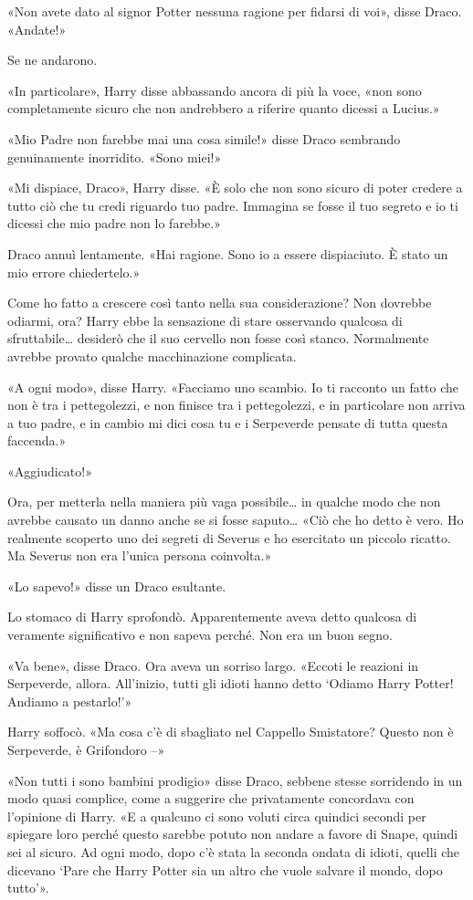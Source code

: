 «Non avete dato al signor Potter nessuna ragione per fidarsi di voi», disse Draco. «Andate!»

Se ne andarono.

«In particolare», Harry disse abbassando ancora di più la voce, «non sono completamente sicuro che non andrebbero a riferire quanto dicessi a Lucius.»

«Mio Padre non farebbe mai una cosa simile!» disse Draco sembrando genuinamente inorridito. «Sono miei!»

«Mi dispiace, Draco», Harry disse. «È solo che non sono sicuro di poter credere a tutto ciò che tu credi riguardo tuo padre. Immagina se fosse il tuo segreto e io ti dicessi che mio padre non lo farebbe.»

Draco annuì lentamente. «Hai ragione. Sono io a essere dispiaciuto. È stato un mio errore chiedertelo.»

Come ho fatto a crescere così tanto nella sua considerazione? Non dovrebbe odiarmi, ora? Harry ebbe la sensazione di stare osservando qualcosa di sfruttabile… desiderò che il suo cervello non fosse così stanco. Normalmente avrebbe provato qualche macchinazione complicata.

«A ogni modo», disse Harry. «Facciamo uno scambio. Io ti racconto un fatto che non è tra i pettegolezzi, e non finisce tra i pettegolezzi, e in particolare non arriva a tuo padre, e in cambio mi dici cosa tu e i Serpeverde pensate di tutta questa faccenda.»

«Aggiudicato!»

Ora, per metterla nella maniera più vaga possibile… in qualche modo che non avrebbe causato un danno anche se si fosse saputo… «Ciò che ho detto è vero. Ho realmente scoperto uno dei segreti di Severus e ho esercitato un piccolo ricatto. Ma Severus non era l’unica persona coinvolta.»

«Lo sapevo!» disse un Draco esultante.

Lo stomaco di Harry sprofondò. Apparentemente aveva detto qualcosa di veramente significativo e non sapeva perché. Non era un buon segno.

«Va bene», disse Draco. Ora aveva un sorriso largo. «Eccoti le reazioni in Serpeverde, allora. All’inizio, tutti gli idioti hanno detto ‘Odiamo Harry Potter! Andiamo a pestarlo!’»

Harry soffocò. «Ma cosa c’è di sbagliato nel Cappello Smistatore? Questo non è Serpeverde, è Grifondoro –»

«Non tutti i sono bambini prodigio» disse Draco, sebbene stesse sorridendo in un modo quasi complice, come a suggerire che privatamente concordava con l’opinione di Harry. «E a qualcuno ci sono voluti circa quindici secondi per spiegare loro perché questo sarebbe potuto non andare a favore di Snape, quindi sei al sicuro. Ad ogni modo, dopo c’è stata la seconda ondata di idioti, quelli che dicevano ‘Pare che Harry Potter sia un altro che vuole salvare il mondo, dopo tutto’».

